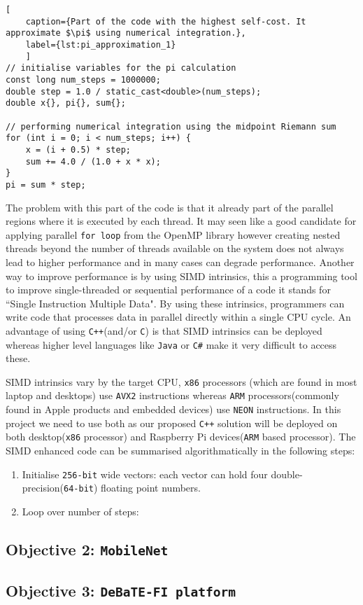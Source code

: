 \begin{lstlisting}[
	caption={Part of the code with the highest self-cost. It approximate $\pi$ using numerical integration.},
	label={lst:pi_approximation_1}
	]
// initialise variables for the pi calculation
const long num_steps = 1000000;
double step = 1.0 / static_cast<double>(num_steps);
double x{}, pi{}, sum{};

// performing numerical integration using the midpoint Riemann sum
for (int i = 0; i < num_steps; i++) {
	x = (i + 0.5) * step;
	sum += 4.0 / (1.0 + x * x);
}
pi = sum * step;
\end{lstlisting}

The problem with this part of the code is that it already part of the parallel regions where it is executed by each thread. It may seen like a good candidate for applying parallel \texttt{for loop} from the OpenMP library however creating nested threads beyond the number of threads available on the system does not always lead to higher performance and in many cases can degrade performance. Another way to improve performance is by using SIMD intrinsics, this a programming tool to improve single-threaded or sequential performance of a code it stands for ``Single Instruction Multiple Data". By using these intrinsics, programmers can write code that processes data in parallel directly within a single CPU cycle. An advantage of using \texttt{C++}(and/or \texttt{C}) is that SIMD intrinsics can be deployed whereas higher level languages like \texttt{Java} or \texttt{C\#} make it very difficult to access these. 

SIMD intrinsics vary by the target CPU, \texttt{x86} processors (which are found in most laptop and desktops) use \texttt{AVX2} instructions whereas \texttt{ARM} processors(commonly found in Apple products and embedded devices) use \texttt{NEON} instructions. In this project we need to use both as our proposed \texttt{C++} solution will be deployed on both desktop(\texttt{x86} processor) and Raspberry Pi devices(\texttt{ARM} based processor). The SIMD enhanced code can be summarised algorithmatically in the following steps:

\begin{enumerate}
	\item Initialise \texttt{256-bit} wide vectors: each vector can hold four double-precision(\texttt{64-bit}) floating point numbers.
	\item Loop over number of steps: 
\end{enumerate}


\subsection{Objective 2: \texttt{MobileNet}}
\subsection{Objective 3: \texttt{DeBaTE-FI platform}}